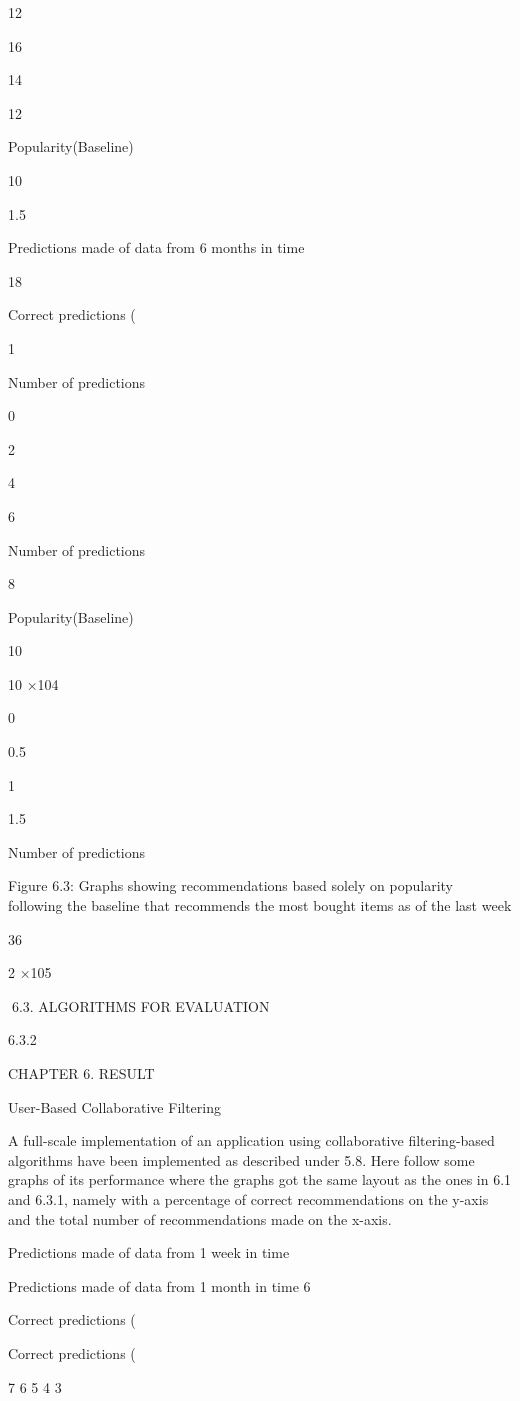 12

16

14

12

Popularity(Baseline)

10

1.5

Predictions made of data from 6 months in time

18

Correct predictions (%

1

Number of predictions

0

2

4

6

Number of predictions

8

Popularity(Baseline)

10

10
×104

0

0.5

1

1.5

Number of predictions

Figure 6.3: Graphs showing recommendations based solely on popularity following the
baseline that recommends the most bought items as of the last week

36

2
×105

6.3. ALGORITHMS FOR EVALUATION

6.3.2

CHAPTER 6. RESULT

User-Based Collaborative Filtering

A full-scale implementation of an application using collaborative filtering-based algorithms have been implemented as described under 5.8. Here follow some graphs of its
performance where the graphs got the same layout as the ones in 6.1 and 6.3.1, namely
with a percentage of correct recommendations on the y-axis and the total number of
recommendations made on the x-axis.

Predictions made of data from 1 week in time

Predictions made of data from 1 month in time
6

Correct predictions (%

Correct predictions (%

7
6
5
4
3


